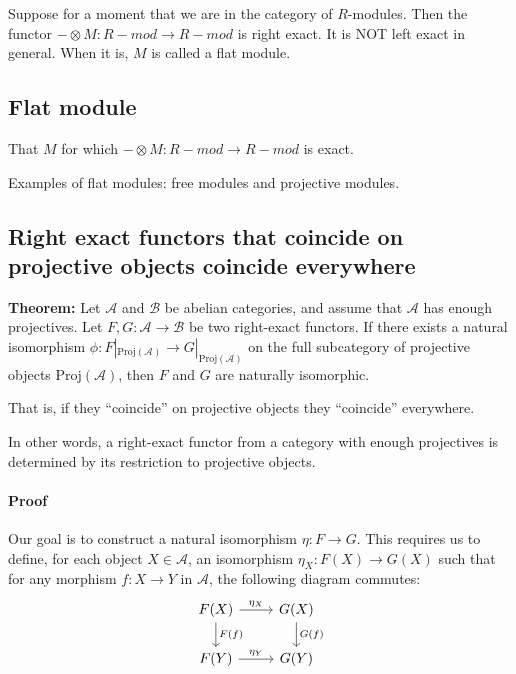 \documentclass[11pt]{article}
\theoremstyle{definition}
\begin{document}
Suppose for a moment that we are in the category of $R$-modules. Then the functor $- \otimes M : R-mod \to R-mod$ is right exact. It is NOT left exact in general. When it is, $M$ is called a flat module.

\subsection{Flat module}

That $M$ for which  $- \otimes M : R-mod \to R-mod$ is exact.

Examples of flat modules: free modules and projective modules.



\subsection{Right exact functors that coincide on projective objects coincide everywhere}




\textbf{Theorem:} Let $\mathcal{A}$ and $\mathcal{B}$ be abelian categories, and assume that $\mathcal{A}$ has enough projectives. Let $F, G: \mathcal{A} \to \mathcal{B}$ be two right-exact functors. If there exists a natural isomorphism $\phi: F|_{\text{Proj}(\mathcal{A})} \to G|_{\text{Proj}(\mathcal{A})}$ on the full subcategory of projective objects $\text{Proj}(\mathcal{A})$, then $F$ and $G$ are naturally isomorphic.


That is, if they ``coincide'' on projective objects they ``coincide'' everywhere.




In other words, a right-exact functor from a category with enough projectives is determined by its restriction to projective objects.



\paragraph{Proof}

Our goal is to construct a natural isomorphism $\eta: F \to G$. This requires us to define, for each object $X \in \mathcal{A}$, an isomorphism $\eta_X: F(X) \to G(X)$ such that for any morphism $f: X \to Y$ in $\mathcal{A}$, the following diagram commutes:
\[
\begin{tikzcd}
F(X) \arrow{r}{\eta_X} \arrow{d}{F(f)} & G(X) \arrow{d}{G(f)} \\
F(Y) \arrow{r}{\eta_Y} & G(Y)
\end{tikzcd}
\]
\end{document}
